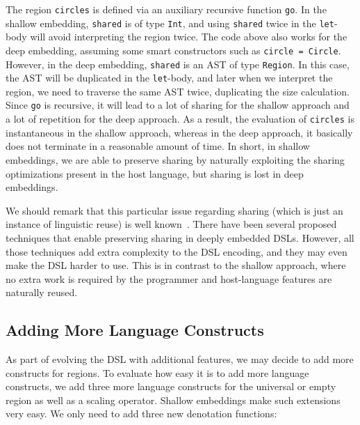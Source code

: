 \noindent
The region \lstinline{circles} is defined via an auxiliary recursive function
\lstinline{go}. In the shallow embedding, \lstinline{shared} is of type
\lstinline{Int}, and using \lstinline{shared} twice in the \lstinline{let}-body
will avoid interpreting the region twice. The code above also works for the deep
embedding, assuming some smart constructors such as \lstinline{circle = Circle}.
However, in the deep embedding, \lstinline{shared} is an AST of type
\lstinline{Region}. In this case, the AST will be duplicated in the
\lstinline{let}-body, and later when we interpret the region, we need to
traverse the same AST twice, duplicating the size calculation. Since
\lstinline{go} is recursive, it will lead to a lot of sharing for the shallow
approach and a lot of repetition for the deep approach. As a result, the
evaluation of \lstinline{circles} is instantaneous in the shallow approach,
whereas in the deep approach, it basically does not terminate in a reasonable
amount of time. In short, in shallow embeddings, we are able to preserve sharing
by naturally exploiting the sharing optimizations present in the host language,
but sharing is lost in deep embeddings.

We should remark that this particular issue regarding sharing (which is just an
instance of linguistic reuse) is well
known~\citep{gill2009type,kiselyov2011implementing,oliveira2013abstract}. There
have been several proposed techniques that enable preserving sharing in deeply
embedded DSLs. However, all those techniques add extra complexity to the DSL
encoding, and they may even make the DSL harder to use. This is in contrast to
the shallow approach, where no extra work is required by the programmer and
host-language features are naturally reused.

\subsection{Adding More Language Constructs}

As part of evolving the DSL with additional features, we may decide to add more
constructs for regions. To evaluate how easy it is to add more language constructs,
we add three more
language constructs for the universal or empty region as well as a scaling
operator. Shallow embeddings make such extensions very easy. We only need
to add three new denotation functions:


